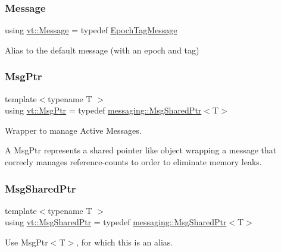 \mbox{\label{namespacevt_a3a3ddfef40b4c90915fa43cdd5f129ea}} 
\subsubsection{\texorpdfstring{Message}{Message}}
{\footnotesize\ttfamily using \hyperlink{namespacevt_a3a3ddfef40b4c90915fa43cdd5f129ea}{vt\+::\+Message} = typedef \hyperlink{namespacevt_a4ccc13b06bff8a4a35426a1a082a95a9}{Epoch\+Tag\+Message}}



Alias to the default message (with an epoch and tag) 

\mbox{\label{namespacevt_a9f5ebd62ee9d6dd8829e3e1cc4f858e9}} 
\subsubsection{\texorpdfstring{Msg\+Ptr}{MsgPtr}}
{\footnotesize\ttfamily template$<$typename T $>$ \\
using \hyperlink{namespacevt_a9f5ebd62ee9d6dd8829e3e1cc4f858e9}{vt\+::\+Msg\+Ptr} = typedef \hyperlink{structvt_1_1messaging_1_1_msg_shared_ptr}{messaging\+::\+Msg\+Shared\+Ptr}$<$T$>$}



Wrapper to manage Active Messages. 

A Msg\+Ptr represents a \textquotesingle{}shared pointer like\textquotesingle{} object wrapping a message that correcly manages reference-\/counts to order to eliminate memory leaks. \mbox{\label{namespacevt_ab2b3d506ec8e8d1540aede826d84a239}} 
\subsubsection{\texorpdfstring{Msg\+Shared\+Ptr}{MsgSharedPtr}}
{\footnotesize\ttfamily template$<$typename T $>$ \\
using \hyperlink{namespacevt_ab2b3d506ec8e8d1540aede826d84a239}{vt\+::\+Msg\+Shared\+Ptr} = typedef \hyperlink{structvt_1_1messaging_1_1_msg_shared_ptr}{messaging\+::\+Msg\+Shared\+Ptr}$<$T$>$}

Use {\ttfamily Msg\+Ptr$<$\+T$>$}, for which this is an alias. \mbox{\label{namespacevt_a408e86a8c7c89309b52907dc5a513924}} 
